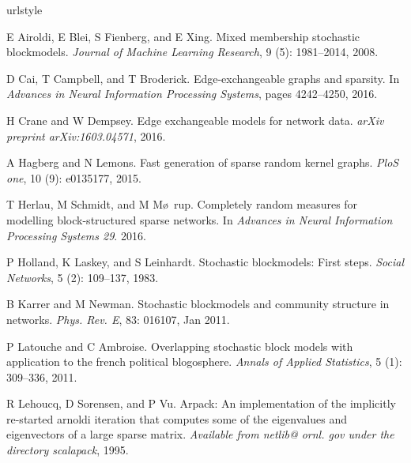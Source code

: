 \documentclass[twoside,11pt]{article}
\begin{document}
\begin{thebibliography}{13}
\providecommand{\natexlab}[1]{#1}
\providecommand{\url}[1]{\texttt{#1}}
\expandafter\ifx\csname urlstyle\endcsname\relax
  \providecommand{\doi}[1]{doi: #1}\else
  \providecommand{\doi}{doi: \begingroup \urlstyle{rm}\Url}\fi

E Airoldi, E Blei, S Fienberg, and E Xing.
\newblock Mixed membership stochastic blockmodels.
\newblock \emph{Journal of Machine Learning Research}, 9 (5):
  1981--2014, 2008.

D Cai, T Campbell, and T Broderick.
\newblock Edge-exchangeable graphs and sparsity.
\newblock In \emph{Advances in Neural Information Processing Systems}, pages
  4242--4250, 2016.

H Crane and W Dempsey.
\newblock Edge exchangeable models for network data.
\newblock \emph{arXiv preprint arXiv:1603.04571}, 2016.

A Hagberg and N Lemons.
\newblock Fast generation of sparse random kernel graphs.
\newblock \emph{PloS one}, 10 (9): e0135177, 2015.

T Herlau, M Schmidt, and M M\o~rup.
\newblock Completely random measures for modelling block-structured sparse
  networks.
\newblock In \emph{Advances in Neural Information Processing Systems 29}. 2016.

P Holland, K Laskey, and S Leinhardt.
\newblock Stochastic blockmodels: First steps.
\newblock \emph{Social Networks}, 5 (2): 109--137, 1983.

B Karrer and M Newman.
\newblock Stochastic blockmodels and community structure in networks.
\newblock \emph{Phys. Rev. E}, 83: 016107, Jan 2011.

P Latouche and C Ambroise.
\newblock Overlapping stochastic block models with application to the french
  political blogosphere.
\newblock \emph{Annals of Applied Statistics}, 5 (1):
  309--336, 2011.

R Lehoucq, D Sorensen, and P Vu.
\newblock Arpack: An implementation of the implicitly re-started arnoldi
  iteration that computes some of the eigenvalues and eigenvectors of a large
  sparse matrix.
\newblock \emph{Available from netlib@ ornl. gov under the directory
  scalapack}, 1995.


\end{thebibliography}
\end{document}
